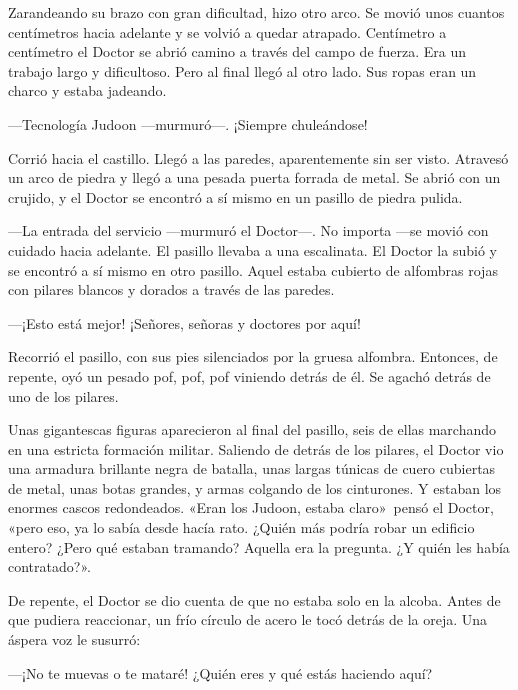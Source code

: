 Zarandeando su brazo con gran dificultad, hizo otro arco. Se movió unos
cuantos centímetros hacia adelante y se volvió a quedar atrapado.
Centímetro a centímetro el Doctor se abrió camino a través del campo de
fuerza. Era un trabajo largo y dificultoso. Pero al final llegó al otro
lado. Sus ropas eran un charco y estaba jadeando.

---Tecnología Judoon ---murmuró---. ¡Siempre chuleándose!

Corrió hacia el castillo. Llegó a las paredes, aparentemente sin ser
visto. Atravesó un arco de piedra y llegó a una pesada puerta forrada de
metal. Se abrió con un crujido, y el Doctor se encontró a sí mismo en un
pasillo de piedra pulida.

---La entrada del servicio ---murmuró el Doctor---. No importa ---se
movió con cuidado hacia adelante. El pasillo llevaba a una escalinata.
El Doctor la subió y se encontró a sí mismo en otro pasillo. Aquel
estaba cubierto de alfombras rojas con pilares blancos y dorados a
través de las paredes.

---¡Esto está mejor! ¡Señores, señoras y doctores por aquí!

Recorrió el pasillo, con sus pies silenciados por la gruesa alfombra.
Entonces, de repente, oyó un pesado pof, pof, pof viniendo detrás de él.
Se agachó detrás de uno de los pilares.

Unas gigantescas figuras aparecieron al final del pasillo, seis de ellas
marchando en una estricta formación militar. Saliendo de detrás de los
pilares, el Doctor vio una armadura brillante negra de batalla, unas
largas túnicas de cuero cubiertas de metal, unas botas grandes, y armas
colgando de los cinturones. Y estaban los enormes cascos redondeados.
«Eran los Judoon, estaba claro»~pensó el Doctor, «pero eso, ya lo sabía
desde hacía rato. ¿Quién más podría robar un edificio entero? ¿Pero qué
estaban tramando? Aquella era la pregunta. ¿Y quién les había
contratado?».

De repente, el Doctor se dio cuenta de que no estaba solo en la alcoba.
Antes de que pudiera reaccionar, un frío círculo de acero le tocó detrás
de la oreja. Una áspera voz le susurró:

---¡No te muevas o te mataré! ¿Quién eres y qué estás haciendo aquí?